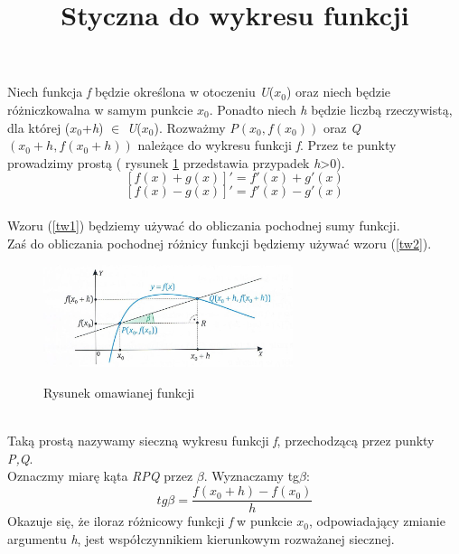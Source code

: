 \documentclass[12pt]{article}
\title{Styczna do wykresu funkcji}
\date{}
\begin{document}
\maketitle
\noindent
Niech funkcja \textit{f} będzie określona w otoczeniu \textit{U}($x_{0}$) oraz niech będzie różniczkowalna w samym punkcie $x_0$. Ponadto niech \textit{h} będzie liczbą rzeczywistą, dla której ($x_0$+\textit{h}) $\in$ \textit{U}($x_{0}$). Rozważmy \textit{P}$\left(x_0, f(x_0)\right)$ oraz \textit{Q}$\left(x_0+h, f(x_0+h)\right)$ należące do wykresu funkcji \textit{f}. Przez te punkty prowadzimy prostą ( rysunek \ref{rys_model} przedstawia przypadek \textit{h}>0).\\
\begin{equation}
\label{tw1}
[f(x)+g(x)]'= f'(x)+g'(x) 
\end{equation}
\begin{equation}
\label{tw2}
[f(x)-g(x)]'= f'(x)-g'(x) 
\end{equation}
\\
Wzoru (\ref{tw1}) będziemy używać do obliczania pochodnej sumy funkcji.\\
Zaś do obliczania pochodnej różnicy funkcji będziemy używać wzoru (\ref{tw2}).
\begin{figure}[ht]
\begin{center}
\includegraphics[height=3cm]{zdj1.jpg}
\caption{Rysunek omawianej funkcji}
\cite{pazdro}
\label{rys_model}
\end{center}
\end{figure}\\
Taką prostą nazywamy sieczną wykresu funkcji \textit{f}, przechodzącą przez punkty \textit{P,Q}.\\
 Oznaczmy miarę kąta \textit{RPQ} przez $\beta$. Wyznaczamy tg$\beta$:\\ 
 \begin{equation}
 \label{twierdzenie}
 tg \beta = \frac{f(x_0+h)-f(x_0)}{h}
 \end{equation}
\newpage Okazuje się, że iloraz różnicowy funkcji \textit{f} w punkcie $x_0$, odpowiadający zmianie argumentu \textit{h}, jest współczynnikiem kierunkowym rozważanej siecznej.\\
\\
\end{document}
